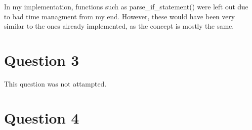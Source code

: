 \documentclass[a4paper, 12pt]{article}
\begin{document}
In my implementation, functions such as parse\_if\_statement() were left out due to bad time managment from my end. However,
these would have been very similar to the ones  already implemented, as the concept is mostly the same.

\section{Question 3}
This question was not attampted.

\section{Question 4}
\end{document}
